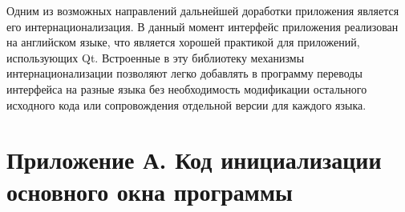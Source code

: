 \documentclass[a4paper,12pt]{article}
\begin{document}
Одним из возможных направлений дальнейшей доработки приложения является его
интернационализация. В данный момент интерфейс приложения реализован на английском
языке, что является хорошей практикой для приложений, использующих Qt. Встроенные
в эту библиотеку механизмы интернационализации позволяют легко добавлять в программу
переводы интерфейса на разные языка без необходимость модификации остального исходного
кода или сопровождения отдельной версии для каждого языка.


\newpage
\appendix

\section*{Приложение А. Код инициализации основного окна программы}
\end{document}
